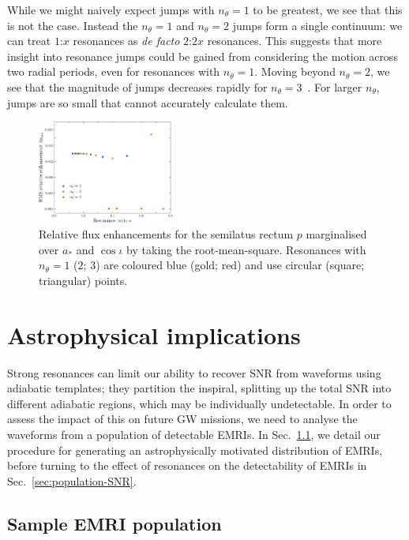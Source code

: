 \documentclass[aps,prd,amsfonts,amssymb,amsmath,nofootinbib,showpacs,superscriptaddress,twocolumn,floatfix]{revtex4-1}
\newcommand{\secref}[1]{Sec.~\ref{sec:#1}}
\begin{document}
While we might naively expect jumps with $n_\theta = 1$ to be greatest, we see that this is not the case. Instead the $n_\theta = 1$ and $n_\theta = 2$ jumps form a single continuum: we can treat $1$:$x$ resonances as \emph{de facto} $2$:$2x$ resonances. This suggests that more insight into resonance jumps could be gained from considering the motion across two radial periods, even for resonances with $n_\theta = 1$. Moving beyond $n_\theta = 2$, we see that the magnitude of jumps decreases rapidly for $n_\theta = 3$~\cite{Flanagan2012a}. For larger $n_\theta$, jumps are so small that cannot accurately calculate them.

\begin{figure}
\centering
\includegraphics[width=0.4\textwidth]{Fig_nu_rms_p}
\caption{\label{fig:res-flux-rms-p-vsnu}Relative flux enhancements for the semilatus rectum $p$ marginalised over $a_\ast$ and $\cos\iota$ by taking the root-mean-square. Resonances with $n_\theta = 1$ ($2$; $3$) are coloured blue (gold; red) and use circular (square; triangular) points.}
\end{figure}

\section{Astrophysical implications}
\label{sec:astrophysics}

Strong resonances can limit our ability to recover SNR from waveforms using adiabatic templates; they partition the inspiral, splitting up the total SNR into different adiabatic regions, which may be individually undetectable. In order to assess the impact of this on future GW missions, we need to analyse the waveforms from a population of detectable EMRIs. In \secref{EMRI-population}, we detail our procedure for generating an astrophysically motivated distribution of EMRIs, before turning to the effect of resonances on the detectability of EMRIs in \secref{population-SNR}.

\subsection{Sample EMRI population}
\label{sec:EMRI-population}
\end{document}
